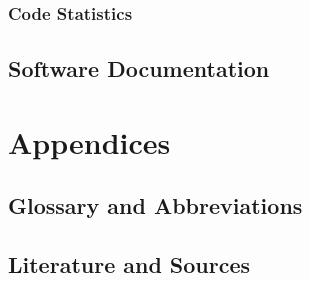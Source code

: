 \documentclass[a4paper,parskip=full]{scrreprt}
\begin{document}
\section{Code Statistics}

\chapter{Software Documentation}


\part{Appendices}

\chapter{Glossary and Abbreviations}

\chapter{Literature and Sources}
\end{document}
